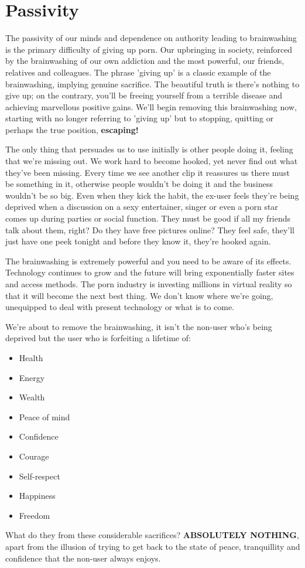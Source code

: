 \documentclass[easypeasy.tex]{subfiles}
\begin{document}
\section{Passivity}
The passivity of our minds and dependence on authority leading to brainwashing is the primary difficulty of giving up porn. Our upbringing in society, reinforced by the brainwashing of our own addiction and the most powerful, our friends, relatives and colleagues. The phrase 'giving up' is a classic example of the brainwashing, implying genuine sacrifice. The beautiful truth is there's nothing to give up; on the contrary, you'll be freeing yourself from a terrible disease and achieving marvellous positive gains. We'll begin removing this brainwashing now, starting with no longer referring to 'giving up' but to stopping, quitting or perhaps the true position, \textbf{escaping!}

The only thing that persuades us to use initially is other people doing it, feeling that we're missing out. We work hard to become hooked, yet never find out what they've been missing. Every time we see another clip it reassures us there must be something in it, otherwise people wouldn't be doing it and the business wouldn't be so big. Even when they kick the habit, the ex-user feels they're being deprived when a discussion on a sexy entertainer, singer or even a porn star comes up during parties or social function. They must be good if all my friends talk about them, right? Do they have free pictures online? They feel safe, they'll just have one peek tonight and before they know it, they're hooked again.

The brainwashing is extremely powerful and you need to be aware of its effects. Technology continues to grow and the future will bring exponentially faster sites and access methods. The porn industry is investing millions in virtual reality so that it will become the next best thing. We don't know where we're going, unequipped to deal with present technology or what is to come.

We're about to remove the brainwashing, it isn't the non-user who's being deprived but the user who is forfeiting a lifetime of:
\begin{itemize}
  \item Health
  \item Energy
  \item Wealth
  \item Peace of mind
  \item Confidence
  \item Courage
  \item Self-respect
  \item Happiness
  \item Freedom
\end{itemize}
What do they from these considerable sacrifices? \textbf{ABSOLUTELY NOTHING}, apart from the illusion of trying to get back to the state of peace, tranquillity and confidence that the non-user always enjoys.
\end{document}
